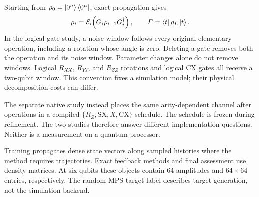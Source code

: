 Starting from $\rho_0=\ket{0^n}\bra{0^n}$, exact propagation gives
\begin{equation}
 \rho_i=\mathcal E_i\!\left(G_i\rho_{i-1}G_i^{\dagger}\right),
 \qquad F=\bra{t}\rho_L\ket{t}.
 \label{eq:noisy_fidelity}
\end{equation}
In the logical-gate study, a noise window follows every original elementary
operation, including a rotation whose angle is zero. Deleting a gate removes
both the operation and its noise window. Parameter changes alone do not
remove windows. Logical $R_{XX}$, $R_{YY}$, and $R_{ZZ}$ rotations and logical
CX gates all receive a two-qubit window. This convention fixes a simulation
model; their physical decomposition costs can differ.

The separate native study instead places the same arity-dependent channel
after operations in a compiled $\{R_Z,\mathrm{SX},X,\mathrm{CX}\}$ schedule.
The schedule is frozen during refinement. The two studies therefore answer
different implementation questions. Neither is a measurement on a quantum
processor.

Training propagates dense state vectors along sampled histories where the
method requires trajectories. Exact feedback methods and final assessment
use density matrices. At six qubits these objects contain 64 amplitudes and
$64\times64$ entries, respectively. The random-MPS target label describes
target generation, not the simulation backend.
